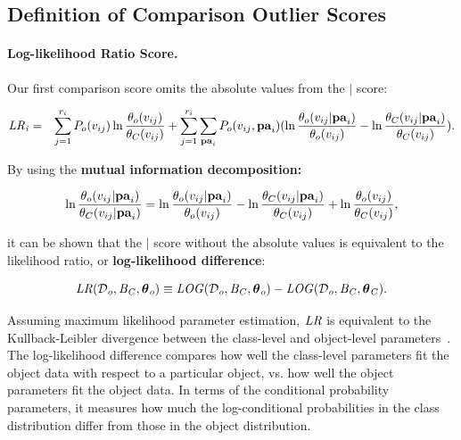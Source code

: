 {\subsection{Definition of Comparison Outlier Scores}

\paragraph{Log-likelihood Ratio Score.} Our first comparison score omits the absolute values from the $\mid$ score: 

\begin{eqnarray*}
\it{LR}_{i} & = & \sum_{j=1}^{r_{i}} P_{o}(v_{ij}) \ln \frac{\theta_{o}( v_{ij})}{\theta_{C}( v_{ij})}+ \sum_{j=1}^{r_{i}} \sum_{\mathbf{pa}_{i}} 
P_{o}( v_{ij},\mathbf{pa}_{i})
(\ln \frac{\theta_{o}( v_{ij}|\mathbf{pa}_{i})}{\theta_{o}(v_{ij})} - \ln \frac{\theta_{C}( v_{ij}|\mathbf{pa}_{i})}{\theta_{C}(v_{ij})}).
\end{eqnarray*}

By using the \textbf{mutual information decomposition:}


\begin{equation} \label{eq:decompose}
\ln \frac{\theta_{o}( v_{ij}|\mathbf{pa}_{i})}{\theta_{C}( v_{ij}|\mathbf{pa}_{i})} = \ln \frac{\theta_{o}(v_{ij}|\mathbf{pa}_{i})}{\theta_{o}(v_{ij})} - \ln \frac{\theta_{C}( v_{ij}|\mathbf{pa}_{i})}{\theta_{C}(v_{ij})} + \ln \frac{\theta_{o}( v_{ij})}{\theta_{C}( v_{ij})},
\end{equation}

\noindent it can be shown that the $\mid$ score without the absolute values is equivalent to 
the likelihood ratio, or {\bf log-likelihood difference}:

\begin{equation} \label{eq:log-diff}
\it{LR}(\mathcal{D}_{o},B_{C},\boldsymbol{\theta}_{o}) \equiv \it{LOG}(\mathcal{D}_{o},B_{C},\boldsymbol{\theta}_{o}) - \it{LOG}(\mathcal{D}_{o},B_{C},\boldsymbol{\theta}_{C}).
\end{equation}

Assuming maximum likelihood parameter estimation, $\it{LR}$ is equivalent to the Kullback-Leibler divergence between the class-level and object-level parameters~\cite{Campos2006}. The log-likelihood difference compares  how well the class-level parameters fit the object data with respect to a particular object, vs. how well the object parameters fit the object data. In terms of the conditional probability parameters, it measures how much the log-conditional probabilities in the class distribution differ from those in the object distribution. 
%
}
